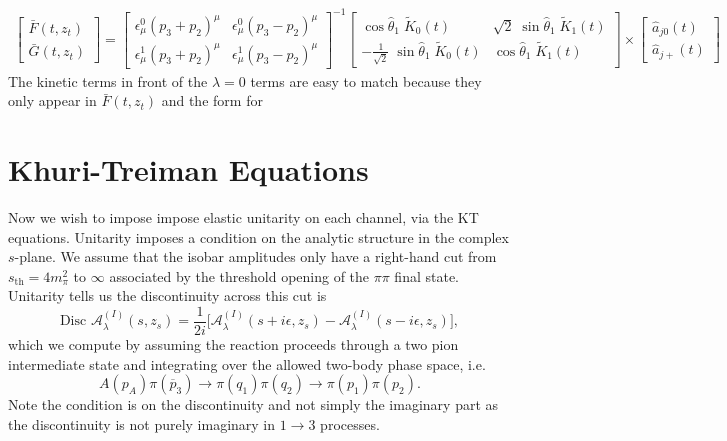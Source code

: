 \documentclass[10pt, aps,prd,amsmath,amssymb,superscriptaddress,onecolumn,
nofootinbib,showpacs,preprintnumbers]{revtex4-1}
\newcommand{\Disc}{\text{Disc }}
\begin{document}
\begin{align}
  \begin{bmatrix}
    \bar{F}(t,z_t) \\
     \bar{G}(t,z_t)
  \end{bmatrix}
  =
  \begin{bmatrix}
    \epsilon_\mu^0 (p_3 + p_2)^\mu & \epsilon_\mu^0 (p_3 - p_2)^\mu \\
  \epsilon_\mu^1  (p_3 + p_2)^\mu & \epsilon_\mu^1 (p_3 - p_2)^\mu
\end{bmatrix}^{-1}
  \begin{bmatrix}
      \cos \hat{\theta}_1 \; \tilde{K}_{0}(t) &  \sqrt{2} \; \sin \hat{\theta}_1 \; \tilde{K}_{1}(t)  \\
     - \frac{1}{\sqrt{2}}  \; \sin \hat{\theta}_1 \; \tilde{K}_{0}(t) & \cos \hat{\theta}_1 \;  \tilde{K}_{1}(t)
  \end{bmatrix}
  \times
  \begin{bmatrix}
    \hat{a}_{j0}(t) \\
     \hat{a}_{j+}(t)
  \end{bmatrix}
\end{align}
The kinetic terms in front of the \(\lambda = 0\) terms are easy to match because they only appear in \(\bar{F}(t,z_t)\) and the form for
\section{Khuri-Treiman Equations} \label{sec:unitarity}

Now we wish to impose impose elastic unitarity on each channel, via the KT equations.
Unitarity imposes a condition on the analytic structure in the complex \(s\)-plane. We assume that the isobar amplitudes only have a right-hand cut from \(s_\text{th} = 4m_\pi^2\) to \(\infty\) associated by the threshold opening of the \(\pi\pi\) final state. Unitarity tells us the discontinuity across this cut is
  \begin{equation}
      \Disc \mathcal{A}^{(I)}_\lambda(s,z_s) = \frac{1}{2i} \bigg[ \mathcal{A}^{(I)}_\lambda(s + i\epsilon, z_s) - \mathcal{A}^{(I)}_\lambda(s-i\epsilon,z_s) \bigg],
  \end{equation}
which we compute by assuming the reaction proceeds through a two pion intermediate state and integrating over the allowed two-body phase space, i.e.
  \begin{equation}
    A(p_A) \pi(\overline{p}_3) \rightarrow \pi(q_1)\pi(q_2) \to \pi(p_1) \pi(p_2).
  \end{equation}
Note the condition is on the discontinuity and not simply the imaginary part as the discontinuity is not purely imaginary in \(1 \to 3\) processes.
\end{document}
